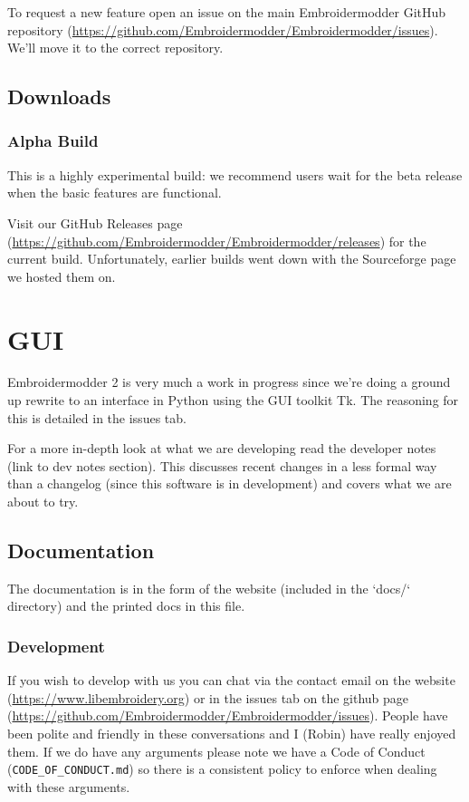 \documentclass[11pt]{report}
\begin{document}
To request a new feature  open an issue on the main Embroidermodder GitHub
repository (\url{https://github.com/Embroidermodder/Embroidermodder/issues}).
We'll move it to the correct repository.

\section{Downloads}

\subsection{Alpha Build}

This is a highly experimental build: we recommend users wait for the beta
release when the basic features are functional.

Visit our  GitHub Releases page
(\url{https://github.com/Embroidermodder/Embroidermodder/releases})
for the current build. Unfortunately, earlier builds went down with the
Sourceforge page we hosted them on.

\chapter{GUI}

Embroidermodder 2 is very much a work in progress since we're doing a ground
up rewrite to an interface in Python using the GUI toolkit Tk. The reasoning for
this is detailed in the issues tab.

For a more in-depth look at what we are developing read the developer notes (link to dev notes
section). This discusses recent changes in a less formal way than a changelog (since this
software is in development) and covers what we are about to try.

\section{Documentation}

The documentation is in the form of the website
(included in the `docs/` directory) and the printed docs in this file.

\subsection{Development}

If you wish to develop with us you can chat via the contact email on the
website (\url{https://www.libembroidery.org}) or in the issues tab on the
github page (\url{https://github.com/Embroidermodder/Embroidermodder/issues}).
People have been polite and friendly in these conversations and I (Robin) have
really enjoyed them. If we do have any arguments please note we have a Code of
Conduct (\texttt{CODE\_OF\_CONDUCT.md}) so there is a consistent policy to enforce when
dealing with these arguments.
\end{document}
